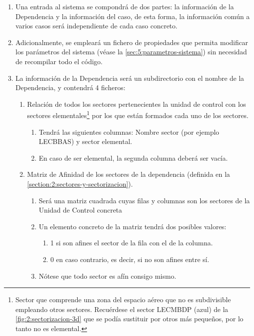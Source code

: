 \begin{enumerate}[label={\textbf{RIO\arabic*}}, ref={Requisito RIO\arabic*},  align=left]
	
	\item  Una entrada al sistema se compondrá de dos partes: la información de la Dependencia y la información del caso, de esta forma, la información común a varios casos será independiente de cada caso concreto.
	
	\item Adicionalmente, se empleará un fichero de propiedades que permita modificar los parámetros del sistema (véase la \autoref{sec:5:parametros-sistema}) sin necesidad de recompilar todo el código.	
	
	\item La información de la Dependencia será un subdirectorio con el nombre de la Dependencia, y contendrá 4 ficheros:
	\begin{enumerate}[label*={\textbf{.\arabic*}}]
		\item  Relación de todos los sectores pertenecientes la unidad de control con los sectores elementales\footnote{
			Sector que comprende una zona del espacio aéreo que no es subdivisible empleando otros sectores. Recuérdese el sector LECMBDP (azul) de la \autoref{fig:2:sectorizacion-3d} que se podía sustituir por otros más pequeños, por lo tanto no es elemental.
		} por los que están formados cada uno de los sectores.
		\begin{enumerate}[label*={\textbf{.\arabic*}}]
			\item Tendrá las siguientes columnas: Nombre sector (por ejemplo LECBBAS) y sector elemental.
			\item En caso de ser elemental, la segunda columna deberá ser vacía.
		\end{enumerate}
		
		\item  Matriz de Afinidad de los sectores de la dependencia (definida en la \autoref{section:2:sectores-y-sectorizacion}).
		\begin{enumerate}[label*={\textbf{.\arabic*}}]
			\item Será una matriz cuadrada cuyas filas y columnas son los sectores de la Unidad de Control concreta
			\item Un elemento concreto de la matriz tendrá dos posibles valores:
			\begin{enumerate}[label*={\textbf{.\arabic*}}]
				\item 1 si son afines el sector de la fila con el de la columna.
				\item 0 en caso contrario, es decir, si no son afines entre sí.
			\end{enumerate}
			\item Nótese que todo sector es afín consigo mismo.
		\end{enumerate}
		

\end{enumerate}
\end{enumerate}
